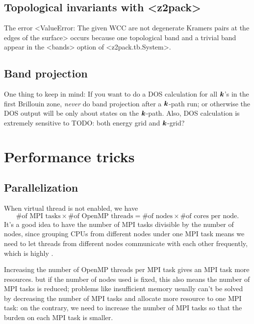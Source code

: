 \documentclass[hyperref, a4paper, 12pt]{report}
\def\texttt#1{<#1>}%
\newcommand{\shortcode}[1]{\texttt{#1}}
\begin{document}
\subsection{Topological invariants with \shortcode{z2pack}}

The error \shortcode{ValueError: The given WCC are not degenerate Kramers pairs at the edges of the surface}
occurs because one topological band and a trivial band appear in the \shortcode{bands} option 
of \shortcode{z2pack.tb.System}.

\subsection{Band projection}

One thing to keep in mind: 
If you want to do a DOS calculation for all $\vb*{k}$'s in the first Brillouin zone,
\emph{never} do band projection after a $\vb*{k}$-path run;
or otherwise the DOS output will be only about states on the $\vb*{k}$-path.
Also, DOS calculation is extremely sensitive to TODO: both energy grid and $\vb*{k}$-grid?

\section{Performance tricks}

\subsection{Parallelization}

When virtual thread is not enabled, we have 
\begin{equation}
    \text{\# of MPI tasks} \times 
    \text{\# of OpenMP threads}
    = \text{\# of nodes} \times 
    \text{\# of cores per node}.
\end{equation}
It's a good idea to have the number of MPI tasks 
divisible by the number of nodes, 
since grouping CPUs from different nodes under one MPI task 
means we need to let threads from different nodes communicate with each other frequently,
which is highly .

Increasing the number of OpenMP threads per MPI task 
gives an MPI task more resources. 
but if the number of nodes used is fixed, 
this also means the number of MPI tasks is reduced; 
problems like insufficient memory 
usually can't be solved by decreasing the number of MPI tasks 
and allocate more resource to one MPI task: 
on the contrary, we need to increase the number of MPI tasks 
so that the burden on each MPI task is smaller.
\end{document}
